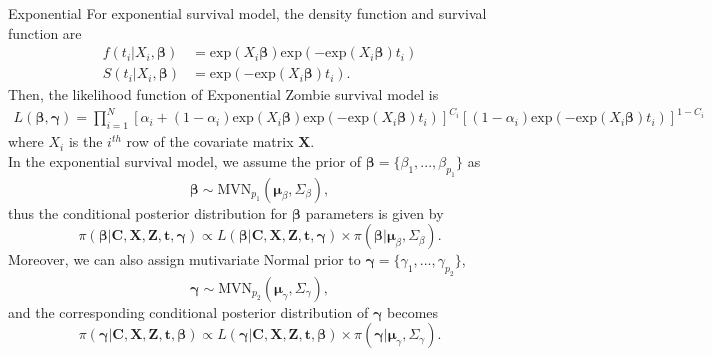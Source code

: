 \documentclass[a4paper, 12pt]{article}
\makeatletter
\newcommand {\dprod}{\displaystyle \prod}
\renewcommand{\subsection}{\@startsection
	{subsection}    {2}    {0mm}    {-0.5\baselineskip}    {0.01\baselineskip}    {\normalfont\normalsize\itshape\center}}
\makeatother
\begin{document}
\subsection{Exponential}
\noindent 
For exponential survival model, the density function and survival function are
\begin{equation}
\begin{aligned}
f(t_i|X_i, \mathbf{\beta}) &= \mbox{exp}(X_i\mathbf{\beta})\mbox{exp}(- \mbox{exp}(X_i\mathbf{\beta})t_i)\\
S(t_i|X_i, \mathbf{\beta}) &= \mbox{exp}(- \mbox{exp}(X_i\mathbf{\beta})t_i).
\end{aligned}
\end{equation}
Then, the likelihood function of Exponential Zombie survival model is
\begin{equation}
\begin{aligned}
L(\mathbf{\beta}, \mathbf{\gamma})=\dprod\limits_{i=1}^{N}[\alpha _{i}+(1-\alpha _{i})\mbox{exp}(X_i\mathbf{\beta})\mbox{exp}(- \mbox{exp}(X_i\mathbf{\beta})t_i)]^{C_{i}}[(1-\alpha _{i})\mbox{exp}(- \mbox{exp}(X_i\mathbf{\beta})t_i)]^{1-C_{i}}
\end{aligned}
\end{equation}
where $X_i$ is the $i^{th}$ row of the covariate matrix $\mathbf{X}$.\\ \newline
In the exponential survival model, we assume the prior of $\mathbf{\beta}=\{\beta_1,...,\beta_{p_1}\}$ as
\begin{equation}
\mathbf{\beta} \sim \mbox{MVN}_{p_1}(\mathbf{\mu}_{\beta}, \Sigma_{\beta}),
\end{equation}
thus the conditional posterior distribution for $\mathbf{\beta}$ parameters is given by
\begin{equation}
\pi(\mathbf{\beta}|\mathbf{C}, \mathbf{X}, \mathbf{Z}, \mathbf{t}, \mathbf{\gamma}) \propto L(\mathbf{\beta}|\mathbf{C}, \mathbf{X}, \mathbf{Z}, \mathbf{t}, \mathbf{\gamma})\times \pi(\mathbf{\beta}|\mathbf{\mu}_{\beta}, \Sigma_{\beta}).
\end{equation}
Moreover, we can also assign mutivariate Normal prior to $\mathbf{\gamma}=\{\gamma_1,...,\gamma_{p_2}\}$,
\begin{equation}
\mathbf{\gamma} \sim \mbox{MVN}_{p_2}(\mathbf{\mu}_{\gamma}, \Sigma_{\gamma}),
\end{equation}
and the corresponding conditional posterior distribution of $\mathbf{\gamma}$ becomes 
\begin{equation}
\pi(\mathbf{\gamma}|\mathbf{C}, \mathbf{X}, \mathbf{Z}, \mathbf{t}, \mathbf{\beta}) \propto L(\mathbf{\gamma}|\mathbf{C}, \mathbf{X}, \mathbf{Z}, \mathbf{t}, \mathbf{\beta})\times \pi(\mathbf{\gamma}|\mathbf{\mu}_{\gamma}, \Sigma_{\gamma}).
\end{equation}
\end{document}
